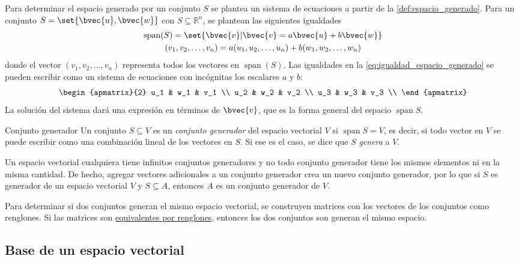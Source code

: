 \documentclass{fmbnotes}
\begin{document}
Para determinar el espacio generado por un conjunto \(S\) se plantea un sistema de ecuaciones a partir de la \autoref{def:espacio_generado}. Para un conjunto \(S=\set{\bvec{u},\bvec{w}}\) con \(S \subseteq \mathbb{R}^{n}\), se plantean las siguientes igualdades
\begin{gather}
\operatorname{span}(S) = \set{\bvec{v}|\bvec{v}=a\bvec{u}+b\bvec{w}} \notag \\
(v_1,v_2,\ldots,v_n)=a(u_1,u_2,\ldots,u_n)+b(w_1,w_2,\ldots,w_n)
\label{eq:igualdad_espacio_generado} 
\end{gather}
donde el vector \( (v_1,v_2,\ldots,v_n) \) representa todos los vectores en \(\operatorname{span}(S)\). Las igualdades en la \autoref{eq:igualdad_espacio_generado}
se pueden escribir como un sistema de ecuaciones con incógnitas los escalares \(a\) y \(b\):
\[ \begin{apmatrix}{2}
u_1 & w_1 & v_1 \\
u_2 & w_2 & v_2 \\
u_3 & w_3 & v_3 \\
\end{apmatrix} \]
La solución del sistema dará una expresión en términos de \(\bvec{v}\), que es la forma general del espacio \(\operatorname{span} S\). 

\begin{definicion}{Conjunto generador}{}
Un conjunto \(S\subseteq V\) es un \emph{conjunto generador} del espacio vectorial \(V\) si \(\operatorname{span} S=V\), es decir, si todo vector en \(V\) se puede escribir como una combinación lineal de los vectores en \(S\). Si ese es el caso, se dice que \(S\) \emph{genera} a \(V\).
\end{definicion}

Un espacio vectorial cualquiera tiene infinitos conjuntos generadores y no todo conjunto generador tiene los mismos elementos ni en la misma cantidad. De hecho, agregar vectores adicionales a un conjunto generador crea un nuevo conjunto generador, por lo que si \(S\) es generador de un espacio vectorial \(V\) y \(S \subseteq A\), entonces \(A\) es un conjunto generador de \(V\). 

Para determinar si dos conjuntos generan el mismo espacio vectorial, se construyen matrices con los vectores de los conjuntos como renglones. Si las matrices son \hyperlink{def:matriz_equivalente_por_renglones}{equivalentes por renglones}, entonces los dos conjuntos son generan el mismo espacio.

\subsection{Base de un espacio vectorial}
\end{document}
